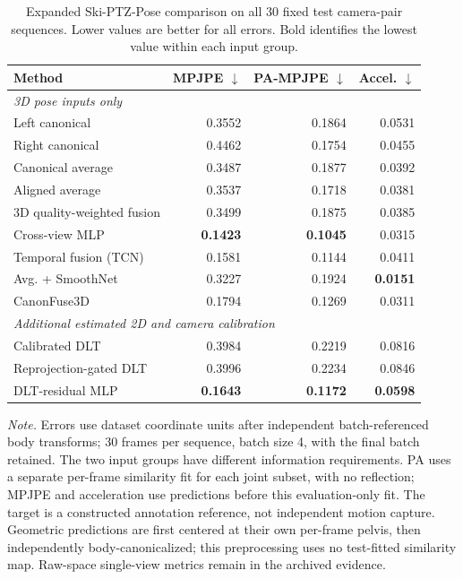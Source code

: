 \begin{table}[t]
\centering
\caption{Expanded Ski-PTZ-Pose comparison on all 30 fixed test camera-pair sequences. Lower values are better for all errors. Bold identifies the lowest value within each input group.}
\label{tab:ski_poseptz_reference}
\small
\setlength{\tabcolsep}{3pt}
\begin{tabular}{@{}lrrr@{}}
\toprule
Method & MPJPE $\downarrow$ & PA-MPJPE $\downarrow$ & Accel. $\downarrow$ \\
\midrule
\multicolumn{4}{l}{\textit{3D pose inputs only}} \\
\midrule
Left canonical & 0.3552 & 0.1864 & 0.0531 \\
Right canonical & 0.4462 & 0.1754 & 0.0455 \\
Canonical average & 0.3487 & 0.1877 & 0.0392 \\
Aligned average & 0.3537 & 0.1718 & 0.0381 \\
3D quality-weighted fusion & 0.3499 & 0.1875 & 0.0385 \\
Cross-view MLP & \textbf{0.1423} & \textbf{0.1045} & 0.0315 \\
Temporal fusion (TCN) & 0.1581 & 0.1144 & 0.0411 \\
Avg. + SmoothNet~\cite{zeng2022smoothnet} & 0.3227 & 0.1924 & \textbf{0.0151} \\
CanonFuse3D & 0.1794 & 0.1269 & 0.0311 \\
\midrule
\multicolumn{4}{l}{\textit{Additional estimated 2D and camera calibration}} \\
\midrule
Calibrated DLT & 0.3984 & 0.2219 & 0.0816 \\
Reprojection-gated DLT & 0.3996 & 0.2234 & 0.0846 \\
DLT-residual MLP & \textbf{0.1643} & \textbf{0.1172} & \textbf{0.0598} \\
\bottomrule
\end{tabular}
\vspace{0.4em}
\begin{minipage}{0.98\linewidth}
\footnotesize\textit{Note.} Errors use dataset coordinate units after independent batch-referenced body transforms; 30 frames per sequence, batch size 4, with the final batch retained. The two input groups have different information requirements. PA uses a separate per-frame similarity fit for each joint subset, with no reflection; MPJPE and acceleration use predictions before this evaluation-only fit. The target is a constructed annotation reference, not independent motion capture. Geometric predictions are first centered at their own per-frame pelvis, then independently body-canonicalized; this preprocessing uses no test-fitted similarity map. Raw-space single-view metrics remain in the archived evidence.
\end{minipage}
\end{table}
